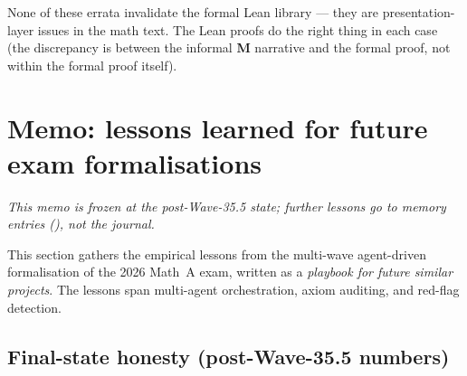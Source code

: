 \documentclass[11pt,a4paper]{article}
\theoremstyle{plain}
\theoremstyle{definition}
\begin{document}
None of these errata invalidate the formal Lean library --- they
are presentation-layer issues in the math text. The Lean proofs
do the right thing in each case (the discrepancy is between the
informal \textbf{M} narrative and the formal proof, not within
the formal proof itself).


\section{Memo: lessons learned for future exam formalisations}\label{sec:memo}

\emph{This memo is frozen at the post-Wave-35.5 state; further
lessons go to memory entries
(), not the
journal.}

This section gathers the empirical lessons from the multi-wave
agent-driven formalisation of the 2026 Math~A exam, written as a
\emph{playbook for future similar projects}. The lessons span
multi-agent orchestration, axiom auditing, and red-flag detection.

\subsection{Final-state honesty (post-Wave-35.5 numbers)}
\end{document}
